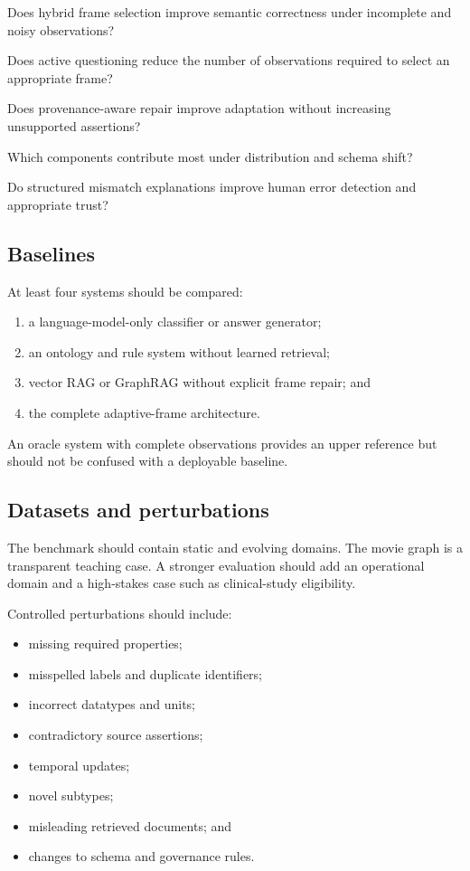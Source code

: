 \documentclass[11pt,a4paper]{article}
\begin{document}
\begin{description}[leftmargin=1.1cm,labelwidth=0.9cm]
  \item[RQ1] Does hybrid frame selection improve semantic correctness under incomplete and noisy observations?
  \item[RQ2] Does active questioning reduce the number of observations required to select an appropriate frame?
  \item[RQ3] Does provenance-aware repair improve adaptation without increasing unsupported assertions?
  \item[RQ4] Which components contribute most under distribution and schema shift?
  \item[RQ5] Do structured mismatch explanations improve human error detection and appropriate trust?
\end{description}

\subsection{Baselines}

At least four systems should be compared:

\begin{enumerate}
  \item a language-model-only classifier or answer generator;
  \item an ontology and rule system without learned retrieval;
  \item vector RAG or GraphRAG without explicit frame repair; and
  \item the complete adaptive-frame architecture.
\end{enumerate}

An oracle system with complete observations provides an upper reference but
should not be confused with a deployable baseline.

\subsection{Datasets and perturbations}

The benchmark should contain static and evolving domains. The movie graph is a
transparent teaching case. A stronger evaluation should add an operational
domain and a high-stakes case such as clinical-study eligibility.

Controlled perturbations should include:

\begin{itemize}
  \item missing required properties;
  \item misspelled labels and duplicate identifiers;
  \item incorrect datatypes and units;
  \item contradictory source assertions;
  \item temporal updates;
  \item novel subtypes;
  \item misleading retrieved documents; and
  \item changes to schema and governance rules.
\end{itemize}
\end{document}
